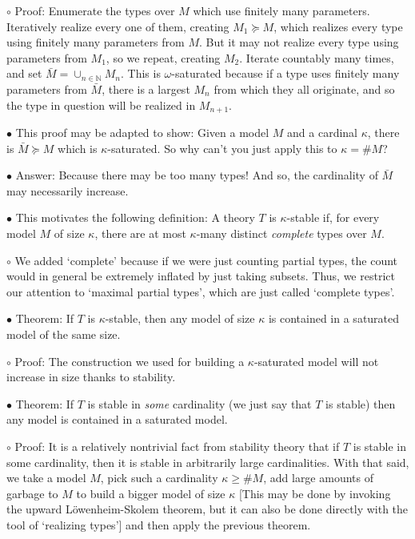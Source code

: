 \documentclass{article}
\newcommand{\N}{\mathbb{N}}
\newcommand{\card}[1]{\# #1}
\newcommand\Point[1]{\noindent \hspace{\labelsep} {\large $\bullet$ #1} \smallskip}
\newcommand\point[1]{\noindent \hspace{\labelsep} {\small $\circ$ #1} \smallskip}
\begin{document}
\point{Proof: Enumerate the types over $M$ which use finitely many parameters. Iteratively realize every one of them, creating $M_1 \succeq M$, which realizes every type using finitely many parameters from $M$. But it may not realize every type using parameters from $M_1$, so we repeat, creating $M_2$. Iterate countably many times, and set $\bar M = \cup_{n \in \N} M_n$. This is $\omega$-saturated because if a type uses finitely many parameters from $\bar M$, there is a largest $M_n$ from which they all originate, and so the type in question will be realized in $M_{n+1}$.}

\Point{This proof may be adapted to show: Given a model $M$ and a cardinal $\kappa$, there is $\bar M \succeq M$ which is $\kappa$-saturated. So why can't you just apply this to $\kappa = \card M$?}

\Point{Answer: Because there may be too many types! And so, the cardinality of $\bar M$ may necessarily increase.}

\Point{This motivates the following definition: A theory $T$ is $\kappa$-stable if, for every model $M$ of size $\kappa$, there are at most $\kappa$-many distinct \emph{complete} types over $M$.}

\point{We added `complete' because if we were just counting partial types, the count would in general be extremely inflated by just taking subsets. Thus, we restrict our attention to `maximal partial types', which are just called `complete types'.}

\Point{Theorem: If $T$ is $\kappa$-stable, then any model of size $\kappa$ is contained in a saturated model of the same size.}

\point{Proof: The construction we used for building a $\kappa$-saturated model will not increase in size thanks to stability.}

\Point{Theorem: If $T$ is stable in \emph{some} cardinality (we just say that $T$ is stable) then any model is contained in a saturated model.}

\point{Proof: It is a relatively nontrivial fact from stability theory that if $T$ is stable in some cardinality, then it is stable in arbitrarily large cardinalities. With that said, we take a model $M$, pick such a cardinality $\kappa \geq \card M$, add large amounts of garbage to $M$ to build a bigger model of size $\kappa$ [This may be done by invoking the upward Löwenheim-Skolem theorem, but it can also be done directly with the tool of `realizing types']  and then apply the previous theorem.}
\end{document}
